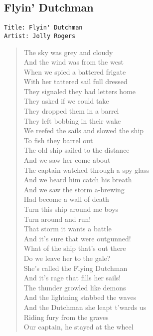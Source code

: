 \documentclass[11pt]{article}
\begin{document}
\subsection{Flyin' Dutchman}
\label{sec:orgb957a5d}
\begin{verbatim}
Title: Flyin' Dutchman
Artist: Jolly Rogers
\end{verbatim}
\begin{verse}
The sky was grey and cloudy\\
And the wind was from the west\\
When we spied a battered frigate\\
With her tattered sail full dressed\\
They signaled they had letters home\\
They asked if we could take\\
They dropped them in a barrel\\
They left bobbing in their wake\\
We reefed the sails and slowed the ship\\
To fish they barrel out\\
The old ship sailed to the distance\\
And we saw her come about\\
The captain watched through a spy-glass\\
And we heard him catch his breath\\
And we saw the storm a-brewing\\
Had become a wall of death\\
\vspace*{1em}
Turn this ship around me boys\\
Turn around and run!\\
That storm it wants a battle\\
And it's sure that were outgunned!\\
What of the ship that's out there\\
Do we leave her to the gale?\\
She's called the Flying Dutchman\\
And it's rage that fills her sails!\\
\vspace*{1em}
The thunder growled like demons\\
And the lightning stabbed the waves\\
And the Dutchman she leapt t'wards us\\
Riding fury from the graves\\
Our captain, he stayed at the wheel\\

\end{verse}
\end{document}
